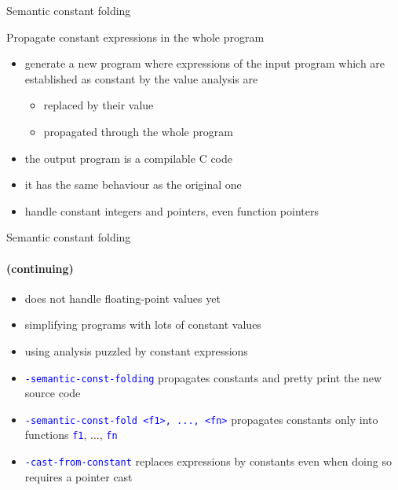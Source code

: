 \documentclass{beamer}
\newcommand{\orange}[1]{{\textcolor{frama-c-1}{#1}}}
\newcommand{\vvert}[1]{{\textcolor{vert}{#1}}}
\newcommand{\bleu}[1]{{\textcolor{blue}{#1}}}
\newcommand{\code}[1]{\bleu{\texttt{#1}}}
\newcommand{\continuing}{\framesubtitle{(continuing)}}
\newcommand{\intro}[1]{\begin{center}\vvert{#1}\end{center}}
\newenvironment{sect}[1]{\orange{#1}\begin{itemize}}{\end{itemize}}
\newenvironment{features}{\begin{sect}{Features}}{\end{sect}}
\newenvironment{whatitisgoodfor}{\begin{sect}{What is it good for}}{\end{sect}}
\newenvironment{howtouse}{\begin{sect}{How to use}}{\end{sect}}
\newenvironment{precise}{\begin{sect}{More precisely}}{\end{sect}}
\begin{document}

\begin{frame}{Semantic constant folding}

\intro{Propagate constant expressions in the whole program}

\begin{precise}
  \item generate a new program where expressions of the input program which are
    established as constant by the value analysis are
    \begin{itemize}
    \item replaced by their value
    \item propagated through the whole program
    \end{itemize}
\end{precise}\smallskip

\begin{features}
\item the output program is a compilable C code
\item it has the same behaviour as the original one
\item handle constant integers and pointers, even function pointers
\end{features}

\end{frame}


\begin{frame}{Semantic constant folding}
\continuing

\begin{sect}{Warning}
\item does not handle floating-point values yet
\end{sect}\smallskip

\begin{whatitisgoodfor}
\item simplifying programs with lots of constant values
\item using analysis puzzled by constant expressions
\end{whatitisgoodfor}\smallskip

\begin{howtouse}
\item \code{-semantic-const-folding} propagates constants and pretty print
  the new source code
\item \code{-semantic-const-fold <f1>, ..., <fn>} propagates constants only
  into functions \code{f1}, ..., \code{fn}
\item \code{-cast-from-constant} replaces expressions by constants even when
  doing so requires a pointer cast
\end{howtouse}

\end{frame}
\end{document}
